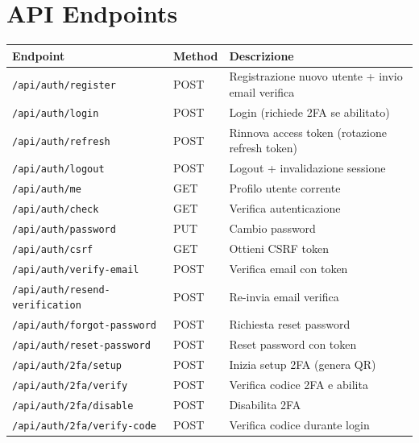 \documentclass[11pt,a4paper]{article}
\begin{document}
\section{API Endpoints}\label{sec:endpoints}

\begin{longtable}{|p{4cm}|p{1.5cm}|p{8cm}|}
\hline
\textbf{Endpoint} & \textbf{Method} & \textbf{Descrizione} \\
\hline
\endfirsthead
\texttt{/api/auth/register} & POST & Registrazione nuovo utente + invio email verifica \\
\hline
\texttt{/api/auth/login} & POST & Login (richiede 2FA se abilitato) \\
\hline
\texttt{/api/auth/refresh} & POST & Rinnova access token (rotazione refresh token) \\
\hline
\texttt{/api/auth/logout} & POST & Logout + invalidazione sessione \\
\hline
\texttt{/api/auth/me} & GET & Profilo utente corrente \\
\hline
\texttt{/api/auth/check} & GET & Verifica autenticazione \\
\hline
\texttt{/api/auth/password} & PUT & Cambio password \\
\hline
\texttt{/api/auth/csrf} & GET & Ottieni CSRF token \\
\hline
\texttt{/api/auth/verify-email} & POST & Verifica email con token \\
\hline
\texttt{/api/auth/resend-verification} & POST & Re-invia email verifica \\
\hline
\texttt{/api/auth/forgot-password} & POST & Richiesta reset password \\
\hline
\texttt{/api/auth/reset-password} & POST & Reset password con token \\
\hline
\texttt{/api/auth/2fa/setup} & POST & Inizia setup 2FA (genera QR) \\
\hline
\texttt{/api/auth/2fa/verify} & POST & Verifica codice 2FA e abilita \\
\hline
\texttt{/api/auth/2fa/disable} & POST & Disabilita 2FA \\
\hline
\texttt{/api/auth/2fa/verify-code} & POST & Verifica codice durante login \\
\hline
\end{longtable}

\appendix
\end{document}
